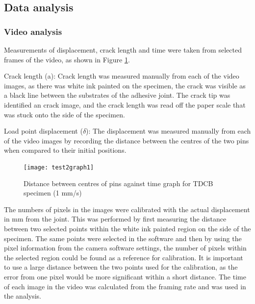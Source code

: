 \documentclass[numbers=noendperiod,chapterprefix=on]{icldt} %
\begin{document}
\subsection{Data analysis}

\subsubsection{Video analysis}
Measurements of displacement, crack length and time were taken from selected frames of the video, as shown in Figure \ref{test2graph1}. 

Crack length (a): Crack length was measured manually from each of the video images, as there was white ink painted on the specimen, the crack was visible as a black line between the substrates of the adhesive joint. The crack tip was identified an crack image, and the crack length was read off the paper scale that was stuck onto the side of the specimen.

Load point displacement ($\delta$): The displacement was measured manually from each of the video images by recording the distance between the centres of the two pins when compared to their initial positions.

\begin{figure}[!htpb]
\centering
\texttt{[image: test2graph1]}
\caption{Distance between centres of pins against time graph for TDCB specimen (1 mm/s)} \label{test2graph1}
\end{figure}
\FloatBarrier

The numbers of pixels in the images were calibrated with the actual displacement in mm from the joint. This was performed by first measuring the distance between two selected points within the white ink painted region on the side of the specimen. The same points were selected in the software and then by using the pixel information from the camera software settings, the number of pixels within the selected region could be found as a reference for calibration. It is important to use a large distance between the two points used for the calibration, as the error from one pixel would be more significant within a short distance. The time of each image in the video was calculated from the framing rate and was used in the analysis.
\end{document}
